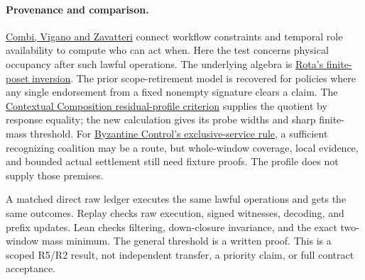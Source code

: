 \documentclass[11pt]{article}
\begin{document}
\paragraph{Provenance and comparison.}
\href{https://arxiv.org/abs/1512.06404}{Combi, Vigano and Zavatteri} connect workflow constraints and temporal role availability to compute who can act when. Here the test concerns physical occupancy after such lawful operations. The underlying algebra is \href{https://math.mit.edu/~rstan/pubs/pubfiles/Stanley_y2000_p203X-XXGian-CarloXRota.pdf}{Rota's finite-poset inversion}. The prior scope-retirement model is recovered for policies where any single endorsement from a fixed nonempty signature clears a claim. The \href{https://github.com/eternal-november/eos-research-programmes/blob/b20c2c1bfebaeb3031e4079a552359fa67933183/projects/contextual-composition/feedback-and-concurrency/observable-covers/Residual_Profiles_and_Admission_Reflection.tex}{Contextual Composition residual-profile criterion} supplies the quotient by response equality; the new calculation gives its probe widths and sharp finite-mass threshold. For \href{https://github.com/eternal-november/eos-research-programmes/blob/b20c2c1bfebaeb3031e4079a552359fa67933183/projects/byzantine-control/exclusive-service/RULE.md}{Byzantine Control's exclusive-service rule}, a sufficient recognizing coalition may be a route, but whole-window coverage, local evidence, and bounded actual settlement still need fixture proofs. The profile does not supply those premises.

A matched direct raw ledger executes the same lawful operations and gets the same outcomes. Replay checks raw execution, signed witnesses, decoding, and prefix updates. Lean checks filtering, down-closure invariance, and the exact two-window mass minimum. The general threshold is a written proof. This is a scoped R5/R2 result, not independent transfer, a priority claim, or full contract acceptance.
\end{document}
